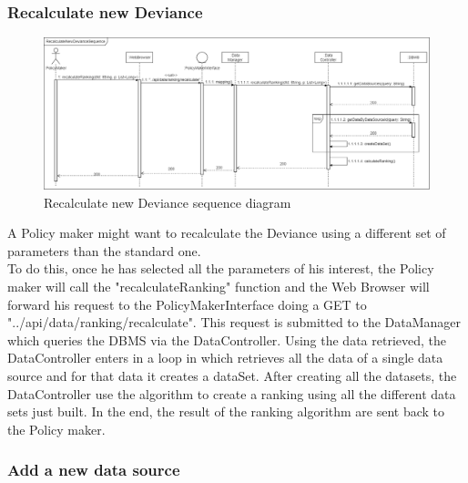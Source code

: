 \newpage
\subsubsection{Recalculate new Deviance}

\begin{figure}[h!]
        \centering
        \includegraphics[scale=0.27]{images/runtime_view/recalculate_new_deviance_runtime_view_diagram.png}
        \caption{Recalculate new Deviance sequence diagram}
        \label{fig:deviance_recalculate_sequence_diagram}
\end{figure}
\FloatBarrier

A Policy maker might want to recalculate the Deviance using a different set of parameters than the standard one.\\
To do this, once he has selected all the parameters of his interest, the Policy maker will call the "recalculateRanking" function and the Web Browser will forward his request to the PolicyMakerInterface doing a GET to "../api/data/ranking/recalculate". This request is submitted to the DataManager which queries the DBMS via the DataController. Using the data retrieved, the DataController enters in a loop in which retrieves all the data of a single data source and for that data it creates a dataSet. After creating all the datasets, the DataController use the algorithm to create a ranking using all the different data sets just built. In the end, the result of the ranking algorithm are sent back to the Policy maker.

\newpage
\subsubsection{Add a new data source}

